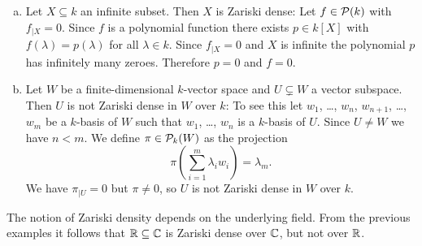 \begin{expls}\leavevmode
 \begin{enumerate}[a)]
  \item 
  Let $X \subseteq k$ an infinite subset. Then $X$ is Zariski dense: Let $f \in \mathcal{P}(k)$ with $f_{|X} = 0$. Since $f$ is a polynomial function there exists $p \in k[X]$ with $f(\lambda) = p(\lambda)$ for all $\lambda \in k$. Since $f_{|X} = 0$ and $X$ is infinite the polynomial $p$ has infinitely many zeroes. Therefore $p = 0$ and $f = 0$.
  \item
  Let $W$ be a finite-dimensional $k$-vector space and $U \subsetneq W$ a vector subspace. Then $U$ is not Zariski dense in $W$ over $k$: To see this let $w_1$, \dots, $w_n$, $w_{n+1}$, \dots, $w_m$ be a $k$-basis of $W$ such that $w_1$, \dots, $w_n$ is a $k$-basis of $U$. Since $U \neq W$ we have $n < m$. We define $\pi \in \mathcal{P}_k(W)$ as the projection
  \[
   \pi\left(\sum_{i=1}^m \lambda_i w_i\right) = \lambda_m.
  \]
  We have $\pi_{|U} = 0$ but $\pi \neq 0$, so $U$ is not Zariski dense in $W$ over $k$.
 \end{enumerate}
\end{expls}


\begin{warn}
 The notion of Zariski density depends on the underlying field. From the previous examples it follows that $\mathbb{R} \subseteq \mathbb{C}$ is Zariski dense over $\mathbb{C}$, but not over $\mathbb{R}$.
\end{warn}



